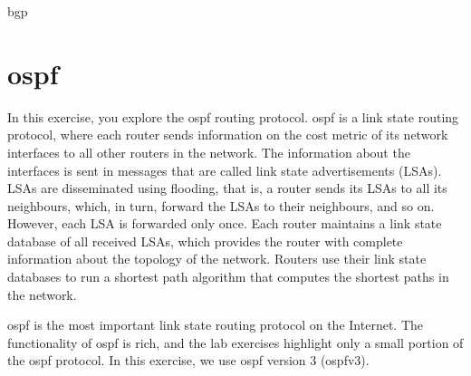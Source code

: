 \begin{exercise}{\acs{bgp}}
\end{exercise}

\newpage
\section{\acl{ospf}}\label{sec:ospf}

In this exercise, you explore the \acf{ospf} routing protocol. \acs{ospf} is a link state routing protocol, where each router sends information on the cost metric of its network interfaces to all other routers in the network. The information about the interfaces is sent in messages that are called link state advertisements (LSAs). LSAs are disseminated using flooding, that is, a router sends its LSAs to all its neighbours, which, in turn, forward the LSAs to their neighbours, and so on. However, each LSA is forwarded only once. Each router maintains a link state database of all received LSAs, which provides the router with complete information about the topology of the network. Routers use their link state databases to run a shortest path algorithm that computes the shortest paths in the network.

\ac{ospf} is the most important link state routing protocol on the Internet. The functionality of \ac{ospf} is rich, and the lab exercises highlight only a small portion of the \ac{ospf} protocol. In this exercise, we use \ac{ospf} version 3 (\ac{ospf}v3).

